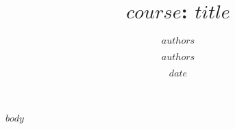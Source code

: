 \documentclass[11pt,a4paper]{article}
\author{$authors$}
\date{$date$}
\numberwithin{equation}{section} %
\begin{document}
\thispagestyle{plain}
\title {\textbf{$course$: $title$}} 
\author {$authors$}
\maketitle
{}
\makeatletter
\renewcommand*\env@matrix[1][*\c@MaxMatrixCols c]{%
  \hskip -\arraycolsep
  \let\@ifnextchar\new@ifnextchar
  \array{#1}}
\makeatother


$body$
\end{document}
